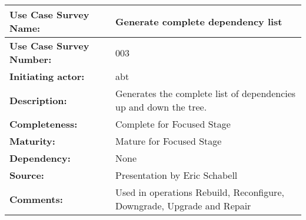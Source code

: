 \begin{tabularx}{\linewidth}{|l|X|}
\hline
\textbf{Use Case Survey Name:} & \textbf{Generate complete dependency list} \\
\hline
\textbf{Use Case Survey Number:} & 003 \\
\hline
\textbf{Initiating actor:} & abt \\
\hline
\textbf{Description:} & Generates the complete list of dependencies up and down the tree.\\
\hline
\textbf{Completeness:} & Complete for Focused Stage \\
\hline
\textbf{Maturity:} & Mature for Focused Stage \\
\hline
\textbf{Dependency:} & None \\
\hline
\textbf{Source:} & Presentation by Eric Schabell \\
\hline
\textbf{Comments:} & Used in operations Rebuild, Reconfigure, Downgrade, Upgrade and Repair\\
\hline
\end{tabularx}
